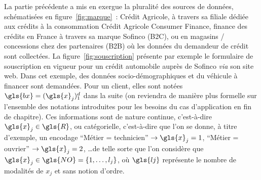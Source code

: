 La partie précédente a mis en exergue la pluralité des sources de données, schématisées en figure~\ref{fig:marque}~: Crédit Agricole, à travers sa filiale dédiée aux crédits à la consommation Crédit Agricole Consumer Finance, finance des crédits en France à travers sa marque Sofinco (B2C), ou en magasins / concessions chez des partenaires (B2B) où les données du demandeur de crédit sont collectées. La figure~\ref{fig:souscription} présente par exemple le formulaire de souscription en vigueur pour un crédit automobile auprès de Sofinco \textit{via} son site web. Dans cet exemple, des données socio-démographiques et du véhicule à financer sont demandées. Pour un client, elles sont notées $\gls{bx} = (\gls{x}_j)_1^d$ dans la suite (on reviendra de manière plus formelle sur l'ensemble des notations introduites pour les besoins du cas d'application en fin de chapitre). Ces informations sont de nature continue, c'est-à-dire $\gls{x}_j \in \gls{R}$, ou catégorielle, c'est-à-dire que l'on se donne, à titre d'exemple, un encodage ``Métier = technicien'' $\rightarrow \gls{x}_j = 1$, ``Métier = ouvrier'' $\rightarrow \gls{x}_j = 2$, \dots de telle sorte que l'on considère que $\gls{x}_j \in \gls{NO} = \{1, \dots,l_j\}$, où $\gls{lj}$ représente le nombre de modalités de $x_j$ et sans notion d'ordre. 

